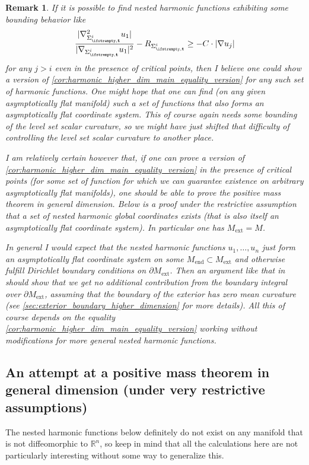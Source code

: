 \documentclass[draft]{amsart}
\newtheorem{remark}[theorem]{Remark}
\newcommand*{\reals}{\mathbb{R}}
\newcommand*{\boundary}{\partial}
\DeclarePairedDelimiter{\abs}{\lvert}{\rvert} %
\newcommand{\ext}{\mathrm{ext}} %
\newcommand{\Mend}{M_{\mathrm{end}}} %
\begin{document}
\begin{remark}
    If it is possible to find nested harmonic functions exhibiting some bounding behavior like
    \begin{equation*}
        \frac{ \abs{\nabla^2_{\nls^i} u_1}}{\abs{\nabla_{\nls^i} u_1}^2}-R_{\nls^i}\geq -C\cdot \abs{\nabla u_j}
    \end{equation*}
    for any \( j>i \) even in the presence of critical points, then I believe one could show a version of \cref{cor:harmonic_higher_dim_main_equality_version} for any such set of harmonic functions. One might hope that one can find (on any given asymptotically flat manifold) such a set of functions that also forms an asymptotically flat coordinate system. This of course again needs some bounding of the level set scalar curvature, so we might have just shifted that difficulty of controlling the level set scalar curvature to another place.

    I am relatively certain however that, if one can prove a version of \cref{cor:harmonic_higher_dim_main_equality_version} in the presence of critical points (for some set of function for which we can guarantee existence on arbitrary asymptotically flat manifolds), one should be able to prove the positive mass theorem in general dimension. Below is a proof under the restrictive assumption that a set of nested harmonic global coordinates exists (that is also itself an asymptotically flat coordinate system). In particular one has \( M_{\ext}=M \).

    In general I would expect that the nested harmonic functions \( u_1,\dotsc,u_n \) just form an asymptotically flat coordinate system on some \( \Mend \subset M_{\ext} \) and otherwise fulfill Dirichlet boundary conditions on \( \boundary M_\ext  \). Then an argument like that in \cite[Section 6.2]{hirschSpacetimeHarmonicFunctions2021} should show that we get no additional contribution from the boundary integral over \( \boundary{M_{\ext}} \), assuming that the boundary of the exterior has zero mean curvature (see \cref{sec:exterior_boundary_higher_dimension} for more details). All this of course depends on the equality \cref{cor:harmonic_higher_dim_main_equality_version} working without modifications for more general nested harmonic functions.
\end{remark}
\subsection{An attempt at a positive mass theorem in general dimension (under very restrictive assumptions)}\label{sec:generalization_computations}
The nested harmonic functions below  definitely do not exist on any manifold that is not diffeomorphic to \( \reals^n \), so keep in mind that all the calculations here are not particularly interesting without some way to generalize this.
\end{document}
